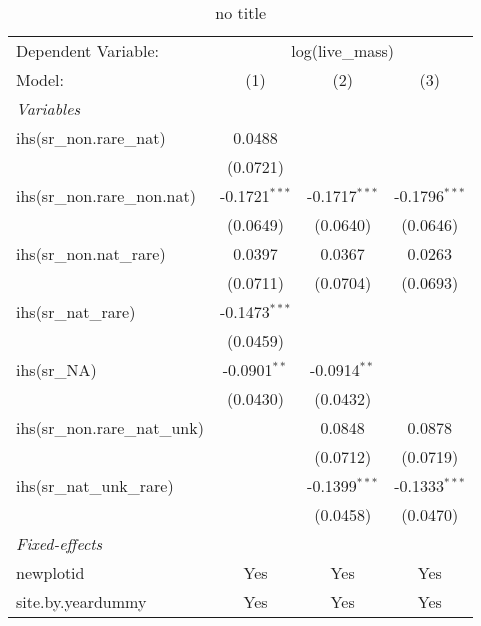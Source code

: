 
\begin{table}[htbp]
   \caption{no title}
   \centering
   \begin{tabular}{lccc}
      \tabularnewline \midrule \midrule
      Dependent Variable: & \multicolumn{3}{c}{log(live\_mass)}\\
      Model:                         & (1)             & (2)             & (3)\\  
      \midrule
      \emph{Variables}\\
      ihs(sr\_non.rare\_nat)         & 0.0488          &                 &   \\   
                                     & (0.0721)        &                 &   \\   
      ihs(sr\_non.rare\_non.nat)     & -0.1721$^{***}$ & -0.1717$^{***}$ & -0.1796$^{***}$\\   
                                     & (0.0649)        & (0.0640)        & (0.0646)\\   
      ihs(sr\_non.nat\_rare)         & 0.0397          & 0.0367          & 0.0263\\   
                                     & (0.0711)        & (0.0704)        & (0.0693)\\   
      ihs(sr\_nat\_rare)             & -0.1473$^{***}$ &                 &   \\   
                                     & (0.0459)        &                 &   \\   
      ihs(sr\_NA)                    & -0.0901$^{**}$  & -0.0914$^{**}$  &   \\   
                                     & (0.0430)        & (0.0432)        &   \\   
      ihs(sr\_non.rare\_nat\_unk)    &                 & 0.0848          & 0.0878\\   
                                     &                 & (0.0712)        & (0.0719)\\   
      ihs(sr\_nat\_unk\_rare)        &                 & -0.1399$^{***}$ & -0.1333$^{***}$\\   
                                     &                 & (0.0458)        & (0.0470)\\   
      \midrule
      \emph{Fixed-effects}\\
      newplotid                      & Yes             & Yes             & Yes\\  
      site.by.yeardummy              & Yes             & Yes             & Yes\\  

\end{tabular}
\end{table}
